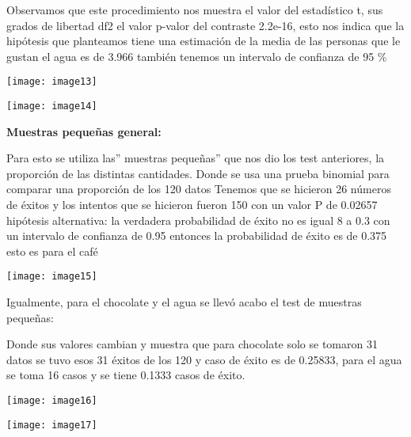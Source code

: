 \documentclass{article} %
\begin{document}
\noindent \textbf{}

\noindent \textbf{}

\noindent Observamos que este procedimiento nos muestra el valor del estad\'{i}stico t, sus grados de libertad df2 el valor p-valor del contraste 2.2e-16, esto nos indica que la hip\'{o}tesis que planteamos tiene una estimaci\'{o}n de la media de las personas que le gustan el agua es de 3.966 tambi\'{e}n tenemos un intervalo de confianza de 95 \%

\noindent \texttt{[image: image13]}

\noindent 

\noindent \texttt{[image: image14]}

\noindent \textbf{}

\noindent \textbf{Muestras peque\~{n}as general:}

\noindent \textbf{}

\noindent Para esto se utiliza las'' muestras peque\~{n}as'' que nos dio los test anteriores, la proporci\'{o}n de las distintas cantidades. Donde se usa una prueba binomial para comparar una proporci\'{o}n de los 120 datos Tenemos que se hicieron 26 n\'{u}meros de \'{e}xitos y los intentos que se hicieron fueron 150 con un valor P de 0.02657 hip\'{o}tesis alternativa: la verdadera probabilidad de \'{e}xito no es igual 8 a 0.3 con un intervalo de confianza de 0.95 entonces la probabilidad de \'{e}xito es de 0.375 esto es para el caf\'{e}\textbf{}

\noindent \textbf{}

\noindent \texttt{[image: image15]}\textbf{}

\noindent Igualmente, para el chocolate y el agua se llev\'{o} acabo el test de muestras peque\~{n}as:

\noindent Donde sus valores cambian y muestra que para chocolate solo se tomaron 31 datos se tuvo esos 31 \'{e}xitos de los 120 y caso de \'{e}xito es de 0.25833, para el agua se toma 16 casos y se tiene 0.1333 casos de \'{e}xito.

\noindent \texttt{[image: image16]}

\noindent \texttt{[image: image17]} 

\noindent \textbf{}

\noindent \textbf{}

\noindent 

\noindent 
\end{document}
